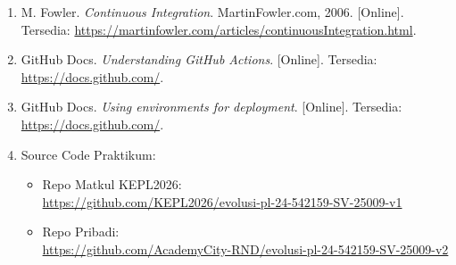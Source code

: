 \begin{enumerate}
    \item \label{fowler} M. Fowler. \textit{Continuous Integration}. MartinFowler.com, 2006. [Online]. Tersedia: \url{https://martinfowler.com/articles/continuousIntegration.html}.
    
    \item \label{github1} GitHub Docs. \textit{Understanding GitHub Actions}. [Online]. Tersedia: \url{https://docs.github.com/}.
    
    \item \label{github2} GitHub Docs. \textit{Using environments for deployment}. [Online]. Tersedia: \url{https://docs.github.com/}.
    
    \item \label{sourcecode} Source Code Praktikum:
    \begin{itemize}
        \item Repo Matkul KEPL2026:\\
        \url{https://github.com/KEPL2026/evolusi-pl-24-542159-SV-25009-v1}
        
        \item Repo Pribadi:\\
        \url{https://github.com/AcademyCity-RND/evolusi-pl-24-542159-SV-25009-v2}
    \end{itemize}
\end{enumerate}
